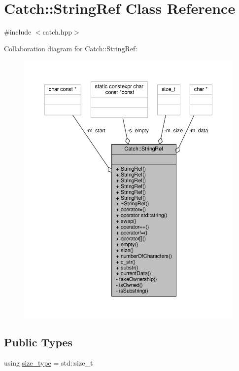 \hypertarget{class_catch_1_1_string_ref}{\section{Catch\-:\-:String\-Ref Class Reference}
\label{class_catch_1_1_string_ref}
}


{\ttfamily \#include $<$catch.\-hpp$>$}



Collaboration diagram for Catch\-:\-:String\-Ref\-:
\nopagebreak
\begin{figure}[H]
\begin{center}
\leavevmode
\includegraphics[width=350pt]{class_catch_1_1_string_ref__coll__graph}
\end{center}
\end{figure}
\subsection*{Public Types}
\begin{DoxyCompactItemize}
\item 
using \hyperlink{class_catch_1_1_string_ref_a06b4db8fc82b197004291cf370b2ba7c}{size\-\_\-type} = std\-::size\-\_\-t
\end{DoxyCompactItemize}
